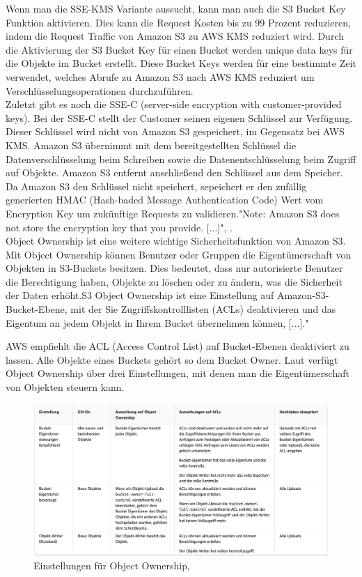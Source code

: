 Wenn man die SSE-KMS Variante aussucht, kann man auch die S3 Bucket Key Funktion aktivieren. Dies kann die Request Kosten bis zu 99 Prozent reduzieren, indem die Request Traffic von Amazon S3 zu AWS KMS reduziert wird. Durch die Aktivierung der S3 Bucket Key für einen Bucket werden unique data keys für die Objekte im Bucket erstellt. Diese Bucket Keys werden für eine bestimmte Zeit verwendet, welches Abrufe zu Amazon S3 nach AWS KMS reduziert um Verschlüsselungsoperationen durchzuführen.\\

Zuletzt gibt es noch die SSE-C (server-side encryption with customer-provided keys). Bei der SSE-C stellt der Customer seinen eigenen Schlüssel zur Verfügung. Dieser Schlüssel wird nicht von Amazon S3 gespeichert, im Gegensatz bei AWS KMS. Amazon S3 übernimmt mit dem bereitgestellten Schlüssel die Datenverschlüsselung beim Schreiben sowie die Datenentschlüsselung beim Zugriff auf Objekte. Amazon S3 entfernt anschließend den Schlüssel aus dem Speicher. Da Amazon S3 den Schlüssel nicht speichert, sepeichert er den zufällig generierten HMAC (Hash-baded Message Authentication Code) Wert vom Encryption Key um zukünftige Requests zu validieren."Note: Amazon S3 does not store the encryption key that you provide. [...]", \cite{aws-sse-c}.\\

Object Ownership ist eine weitere wichtige Sicherheitsfunktion von Amazon S3. Mit Object Ownership können Benutzer oder Gruppen die Eigentümerschaft von Objekten in S3-Buckets besitzen. Dies bedeutet, dass nur autorisierte Benutzer die Berechtigung haben, Objekte zu löschen oder zu ändern, was die Sicherheit der Daten erhöht.\glqq S3 Object Ownership ist eine Einstellung auf Amazon-S3-Bucket-Ebene, mit der Sie Zugriffskontrolllisten (ACLs) deaktivieren und das Eigentum an jedem Objekt in Ihrem Bucket übernehmen können, [...]." \cite{aws-iam-s3}\\ 

\newpage

AWS empfiehlt die ACL (Access Control List) auf Bucket-Ebenen deaktiviert zu lassen. Alle Objekte eines Buckets gehört so dem Bucket Owner. Laut \citeauthor{aws-iam-s3} verfügt Object Ownership über drei Einstellungen, mit denen man die Eigentümerschaft von Objekten steuern kann.

\begin{figure}[h]
\centering
	\includegraphics[width=13cm,keepaspectratio]{Pictures/objectOwnershipTable.png}
	\caption{Einstellungen für Object Ownership, }
\end{figure}


